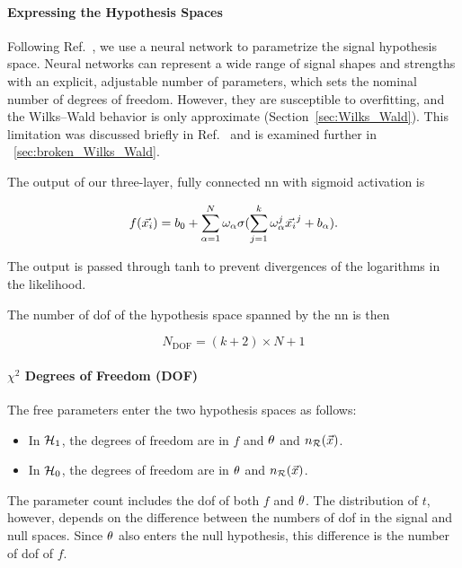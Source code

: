 \documentclass[paper/ddppaper2.tex]{subfiles}
\begin{document}
\paragraph{Expressing the Hypothesis Spaces}

Following Ref.~\cite{LastDDPPaper}, we use a neural network to parametrize the signal hypothesis space. Neural networks can represent a wide range of signal shapes and strengths with an explicit, adjustable number of parameters, which sets the nominal number of degrees of freedom. However, they are susceptible to overfitting, and the Wilks--Wald behavior is only approximate (Section~\ref{sec:Wilks_Wald}). This limitation was discussed briefly in Ref.~\cite{LastDDPPaper} and is examined further in \iftoggle{ispaper}{Appendix}{Section}~\ref{sec:broken_Wilks_Wald}.

The output of our three-layer, fully connected \gls{nn} with sigmoid activation is

\begin{equation}
\label{eq:neural_net_explicit}
    f(\event) = b_{0} + \sum\limits_{\alpha = 1}^{N} \omega_{\alpha} \sigma(\sum\limits_{j = 1}^{k}\omega^j_{\alpha} \event^j + b_\alpha).
\end{equation}

The output is passed through tanh to prevent divergences of the logarithms in the likelihood.

The number of \gls{dof} of the hypothesis space spanned by the \gls{nn} is then

\begin{equation}
    N_\text{DOF} = (k + 2) \times N + 1
\end{equation}

\paragraph{\texorpdfstring{$\chi^2$}{Chi-squared} Degrees of Freedom (DOF)}
The free parameters enter the two hypothesis spaces as follows:
\begin{itemize}
    \item In ${\mathcal{H}_{1}}$, the degrees of freedom are in $f$ and ${\theta}$ and $n_{\mathcal{R}}({\vec{{x}}})$.
    \item In ${{\mathcal{H}_{0}}}$, the degrees of freedom are in ${\theta}$ and $n_{\mathcal{R}}({\vec{{x}}})$.
\end{itemize}

The parameter count includes the \gls{dof} of both $f$ and ${\theta}$. The distribution of $t$, however, depends on the difference between the numbers of \gls{dof} in the signal and null spaces. Since ${\theta}$ also enters the null hypothesis, this difference is the number of \gls{dof} of $f$.
\end{document}
